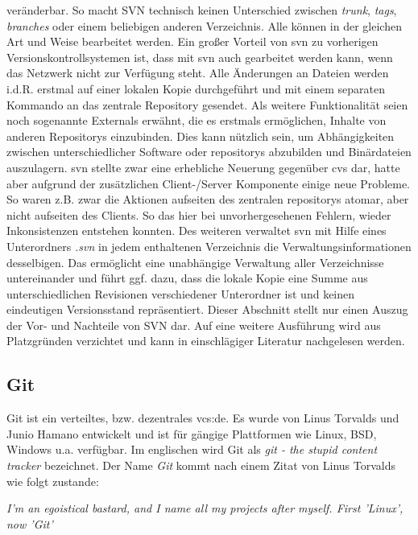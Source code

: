 veränderbar.  So macht SVN technisch keinen Unterschied zwischen
\textit{trunk}, \textit{tags}, \textit{branches} oder einem beliebigen anderen
Verzeichnis. Alle können in der gleichen Art und Weise bearbeitet werden. Ein
großer Vorteil von \acrshort{svn} zu vorherigen Versionskontrollsystemen ist,
dass mit \acrshort{svn} auch gearbeitet werden kann, wenn das Netzwerk nicht
zur Verfügung steht. Alle Änderungen an Dateien werden i.d.R. erstmal auf einer
lokalen Kopie durchgeführt und mit einem separaten Kommando an das zentrale
Repository gesendet. Als weitere Funktionalität seien noch sogenannte Externals
erwähnt, die es erstmals ermöglichen, Inhalte von anderen Repositorys
einzubinden. Dies kann nützlich sein, um Abhängigkeiten zwischen
unterschiedlicher Software oder \glspl{repository} abzubilden und Binärdateien
auszulagern. \acrshort{svn} stellte zwar eine erhebliche Neuerung gegenüber
\acrshort{cvs} dar, hatte aber aufgrund der zusätzlichen Client-/Server
Komponente einige neue Probleme. So waren z.B. zwar die Aktionen aufseiten des
zentralen \glspl{repository} atomar, aber nicht aufseiten des Clients. So das
hier bei unvorhergesehenen Fehlern, wieder Inkonsistenzen entstehen konnten.
Des weiteren verwaltet \acrshort{svn} mit Hilfe eines Unterordners
\textit{.svn} in jedem enthaltenen Verzeichnis die Verwaltungsinformationen
desselbigen. Das ermöglicht eine unabhängige Verwaltung aller Verzeichnisse
untereinander und führt ggf. dazu, dass die lokale Kopie eine Summe aus
unterschiedlichen Revisionen verschiedener Unterordner ist und keinen
eindeutigen Versionsstand repräsentiert.  Dieser Abschnitt stellt nur einen
Auszug der Vor- und Nachteile von SVN dar. Auf eine weitere Ausführung wird aus
Platzgründen verzichtet und kann in einschlägiger Literatur nachgelesen
werden.\cite[S.~383-385]{cd}

\subsection{Git}\label{git}
Git ist ein verteiltes, bzw. dezentrales \acrlong{vcs:de}. Es wurde von Linus
Torvalds und Junio Hamano entwickelt und ist für gängige Plattformen wie Linux,
BSD, Windows u.a. verfügbar. Im englischen wird Git als \textit{git - the
stupid content tracker} bezeichnet. Der Name \textit{Git} kommt nach einem
Zitat von Linus Torvalds wie folgt zustande\cite{link:gitfaq}:

\begin{center}
\textit{\glqq{}I'm an egoistical bastard, and I name all my projects after
myself. First 'Linux', now 'Git'\grqq{}}\\
\end{center}

